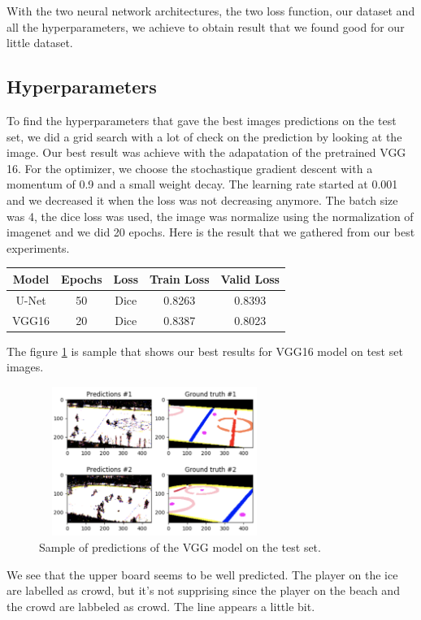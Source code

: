 With the two neural network architectures, the two loss function, our dataset and all the hyperparameters, we achieve to obtain result that we found good for our little dataset. 

\subsection{Hyperparameters}

To find the hyperparameters that gave the best images predictions on the test set, we did a grid search with a lot of check on the prediction by looking at the image. Our best result was achieve with the adapatation of the pretrained VGG 16. For the optimizer, we choose the stochastique gradient descent with a momentum of 0.9 and a small weight decay. The learning rate started at 0.001 and we decreased it when the loss was not decreasing anymore. The batch size was 4, the dice loss was used, the image was normalize using the normalization of imagenet and we did 20 epochs. Here is the result that we gathered from our best experiments.
\vspace{2mm}
\setlength{\tabcolsep}{1mm}
\begin{tabular}{c c c c c}
	\toprule
	Model & Epochs & Loss & Train Loss & Valid Loss \\
	\midrule
	U-Net & 50 & Dice & 0.8263 & 0.8393 \\
	VGG16 & 20 & Dice & 0.8387 & 0.8023 \\
\end{tabular}

\vspace{1mm}

 The figure \ref{fig:test} is sample that shows our best results for VGG16 model on test set images.
 
 \begin{figure}[H]
 	\centering
 	\includegraphics[width=7.5cm,height=4.86cm]{figures/test-9-class.png}
 	\caption{Sample of predictions of the VGG model on the test set.}
 	\label{fig:test}
 \end{figure}

We see that the upper board seems to be well predicted. The player on the ice are labelled as crowd, but it's not supprising since the player on the beach and the crowd are labbeled as crowd. The line appears a little bit.
